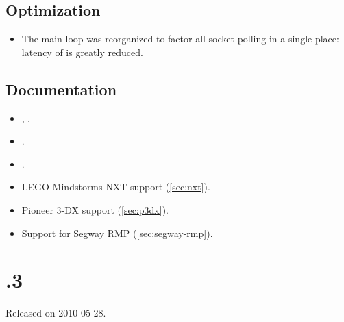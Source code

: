 \subsection{Optimization}
\begin{itemize}
\item The main loop was reorganized to factor all socket polling in a single
  place: latency of  is greatly reduced.
\end{itemize}

\subsection{Documentation}
\begin{itemize}
\item {},  .
\item {}.
\item {}.
\item LEGO Mindstorms NXT support (\autoref{sec:nxt}).
\item Pioneer 3-DX support (\autoref{sec:p3dx}).
\item Support for Segway RMP (\autoref{sec:segway-rmp}).
\end{itemize}


\section{.3}
Released on 2010-05-28.

